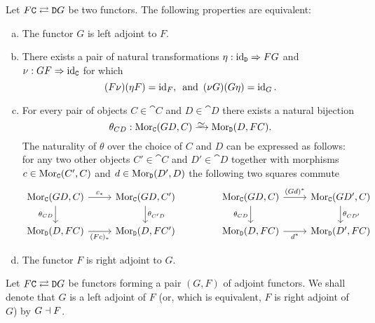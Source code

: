 \begin{theorem}
\label{thm:equivalent-defs-adjoint-pair}
Let \(F \relax \texttt C \rightleftarrows \texttt D \relax G\) be two functors. The following
properties are equivalent:
\begin{enumerate}[(a)]\setlength\itemsep{0em}
\item The functor \(G\) is left adjoint to \(F\).
\item There exists a pair of natural transformations
  \(\eta: \operatorname{id}_{\texttt D} \Rightarrow F G\) and \(\nu: G F \Rightarrow \operatorname{id}_{\texttt C}\) for which
  \[
  (F \nu) (\eta F) = \operatorname{id}_F,\,
  \text{ and }\,
  (\nu G) (G \eta) = \operatorname{id}_G.
  \]

\item For every pair of objects \(C \in \cat C\) and \(D \in \cat D\) there exists a
  natural bijection
  \[
  \theta_{C D}: \Mor_{\cat C}(G D, C) \isoto \Mor_{\cat D}(D, F C).
  \]
  The naturality of \(\theta\) over the choice of \(C\) and \(D\) can be expressed as
  follows: for any two other objects \(C' \in \cat C\) and \(D' \in \cat D\)
  together with morphisms \(c \in \operatorname{Mor}_{\texttt C}(C', C)\) and \(d \in \operatorname{Mor}_{\texttt
    D}(D', D)\) the following two squares commute
  \[
  \begin{tikzcd}
  \Mor_{\cat C}(G D, C) \ar[r, "c_{*}"] \ar[d, "\theta_{C D}"']
  &\Mor_{\cat C}(G D, C') \ar[d, "\theta_{C' D}"]
  \\
  \Mor_{\cat D}(D, F C) \ar[r, "{(F c)_{*}}"']
  &\Mor_{\cat D}(D, F C')
  \end{tikzcd}
  \qquad
  \qquad
  \begin{tikzcd}
  \Mor_{\cat C}(G D, C) \ar[r, "(G d)^{*}"]
  \ar[d, "\theta_{C D}"']
  &\Mor_{\cat C}(G D', C) \ar[d, "\theta_{C D'}"]
  \\
  \Mor_{\cat D}(D, F C) \ar[r, "{d^{*}}"']
  &\Mor_{\cat D}(D', F C)
  \end{tikzcd}
  \]

\item The functor \(F\) is right adjoint to \(G\).
\end{enumerate}
\end{theorem}

\begin{notation}
\label{not:adjoint-functor}
Let \(F \relax \texttt C \rightleftarrows \texttt D \relax G\) be functors forming a pair
\((G, F)\) of adjoint functors. We shall denote that \(G\) is a left adjoint of
\(F\) (or, which is equivalent, \(F\) is right adjoint of \(G\)) by
\(G \dashv F\).
\end{notation}


